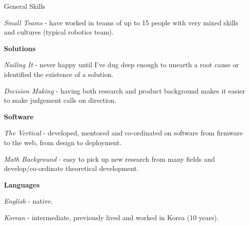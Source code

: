 \documentclass[a4paper,10pt]{article}
\begin{document}
\begin{cvsection}{General Skills}
\begin{djs_itemize}
\begin{djs_itemize}
      \item \textit{Small Teams} - have worked in teams of up to 15 people with very mixed skills and cultures (typical robotics team). 
    \end{djs_itemize}
    \item \textbf{Solutions}
    \begin{djs_itemize}
      \item \textit{Nailing It} - never happy until I've dug deep enough to unearth a root cause or identified the existence of a solution.
      \item \textit{Decision Making} - having both research and product background makes it easier to make judgement calls on direction.
    \end{djs_itemize}
    \item \textbf{Software}
    \begin{djs_itemize}
      \item \textit{The Vertical} - developed, mentored and co-ordinated on software from firmware to the web, from design to deployment.
      \item \textit{Math Background} - easy to pick up new research from many fields and develop/co-ordinate theoretical development.
    \end{djs_itemize}
    \item \textbf{Languages}
    \begin{djs_itemize}
      \item \textit{English} - native.
      \item \textit{Korean} - intermediate, previously lived and worked in Korea (10 years).
    \end{djs_itemize}
  \end{djs_itemize}
\end{cvsection}

\vspace{2em}
\end{document}
